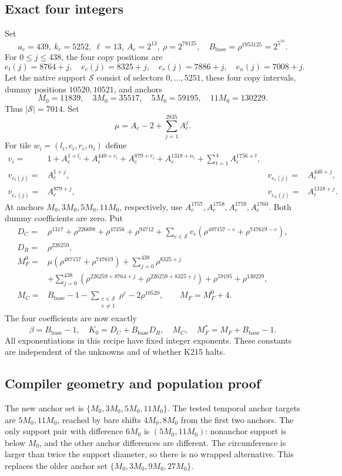 \documentclass[11pt,letterpaper]{article}
\theoremstyle{remark}\newtheorem{remark}[theorem]{Remark}
\begin{document}
\subsection{Exact four integers}
Set
\[
 a_c=439,\ k_c=5252,\ \ell=13,\ A_c=2^{13},\
 \rho=2^{78125},\quad B_{\mathrm{base}}=\rho^{1953125}=2^{5^{16}}.
\]
For $0\leq j\leq438$, the four copy positions are
\[
 e_l(j)=8764+j,\quad e_c(j)=8325+j,\quad
 e_r(j)=7886+j,\quad e_n(j)=7008+j.
\]
Let the native support $\mathcal S$ consist of selectors $0,\ldots,5251$,
these four copy intervals, dummy positions $10520,10521$, and anchors
\[
 M_0=11839,\quad3M_0=35517,\quad5M_0=59195,\quad11M_0=130229.
\]
Thus $|\mathcal S|=7014$. Set
\[
 \mu=A_c-2+\sum_{j=1}^{2835}A_c^j.
\]
For tile $w_i=(l_i,c_i,r_i,n_i)$ define
\begin{align*}
 v_i={}&1+A_c^{1+l_i}+A_c^{440+c_i}+A_c^{879+r_i}
          +A_c^{1318+n_i}+\sum_{t=1}^{4}A_c^{1756+t},\\
 v_{e_l(j)}={}&A_c^{1+j},&v_{e_c(j)}={}&A_c^{440+j},\\
 v_{e_r(j)}={}&A_c^{879+j},&v_{e_n(j)}={}&A_c^{1318+j}.
\end{align*}
At anchors $M_0,3M_0,5M_0,11M_0$, respectively, use
$A_c^{1757},A_c^{1758},A_c^{1759},A_c^{1760}$. Both dummy coefficients are
zero. Put
\begin{align}
 D_C={}&\rho^{1317}+\rho^{226698}+\rho^{47356}+\rho^{94712}
       +\sum_{e\in\mathcal S}v_e(\rho^{487157-e}+\rho^{747619-e}),\nonumber\\
 D_R={}&\rho^{226259},\nonumber\\
 M_F^0={}&\mu(\rho^{487157}+\rho^{747619})
       +\sum_{j=0}^{438}\rho^{8325+j}\label{eq:coefficientrecipe}\\
       &+\sum_{j=0}^{438}(\rho^{226259+8764+j}+\rho^{226259+8325+j})
       +\rho^{59195}+\rho^{130229},\nonumber\\
 M_C={}&B_{\mathrm{base}}-1-
          \sum_{\substack{e\in\mathcal S\\e\ne1}}\rho^e-2\rho^{10520},
 \qquad M_F=M_F^0+4.\nonumber
\end{align}
The four coefficients are now exactly
\[
 \boxed{\beta=B_{\mathrm{base}}-1,\quad K_0=D_C+B_{\mathrm{base}}D_R,
 \quad M_C,\quad M_F^*=M_F+B_{\mathrm{base}}-1.}
\]
All exponentiations in this recipe have fixed integer exponents. These
constants are independent of the unknowns and of whether K215 halts.

\subsection{Compiler geometry and population proof}
The new anchor set is $\{M_0,3M_0,5M_0,11M_0\}$. The tested temporal
anchor targets are $5M_0,11M_0$, reached by bare shifts $4M_0,8M_0$
from the first two anchors. The only support pair with difference $6M_0$
is $(5M_0,11M_0)$: nonanchor support is below $M_0$, and the other anchor
differences are different. The circumference is larger than twice the
support diameter, so there is no wrapped alternative. This replaces the
older anchor set $\{M_0,3M_0,9M_0,27M_0\}$.
\end{document}
